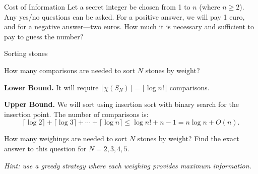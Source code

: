 \documentclass[handout,aspectratio=169]{beamer}
\begin{document}
\begin{frame}{Cost of Information}
    Let a secret integer be chosen from 1 to \(n\) (where \(n \ge 2\)).
    Any yes/no questions can be asked. For a positive answer, we will pay 1 euro, and for a negative answer—two euros. How much it is necessary and sufficient to pay to guess the number?
\end{frame}

\begin{frame}{Sorting stones}
    \begin{example}
    How many comparisons are needed to sort \(N\) stones by weight?
    \end{example}

    \begin{solution}
    \textbf{Lower Bound.} It will require \(\lceil\chi(S_N)\rceil = \lceil\log n!\rceil\) comparisons.
    \pause\medskip

    \textbf{Upper Bound.} We will sort using insertion sort with binary search for the insertion point. The number of comparisons is:
    \[
    \lceil\log 2\rceil + \lceil\log 3\rceil + \dotsb + \lceil\log n\rceil \le \log n! + n - 1 = n\log n + O(n).
    \]
    \end{solution}

    \pause

    How many weighings are needed to sort \(N\) stones by weight?
    Find the exact answer to this question for \(N = 2, 3, 4, 5\).

    \pause
    \emph{Hint: use a greedy strategy where each weighing provides maximum information.}
\end{frame}
\end{document}
